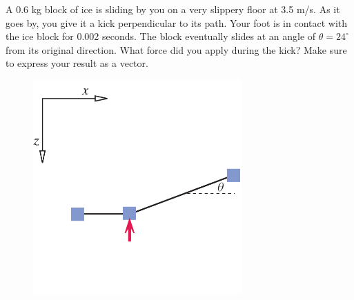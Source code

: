 \question[15] A 0.6 kg block of ice is sliding by you on a very slippery floor at 3.5 m/s. As it goes by, you give it a kick perpendicular to its path. Your foot is in contact with the ice block for 0.002 seconds. The block eventually slides at an angle of $\theta=24^\circ$ from its original direction. What force did you apply during the kick? Make sure to express your result as a vector.

\begin{figure}[ht!]
	\centering
	\includegraphics[width=8cm]{iceblock.jpg}
\end{figure}